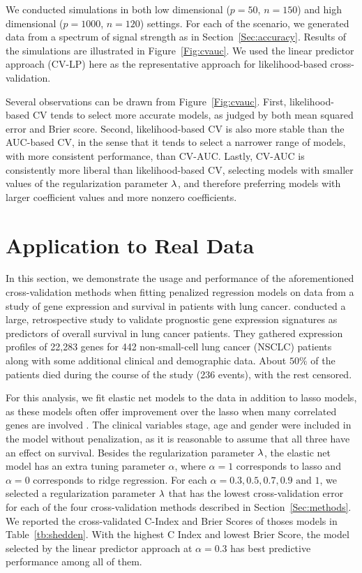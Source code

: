 \par We conducted simulations in both low dimensional ($p = 50$, $n = 150$) and high dimensional ($p = 1000$, $n = 120$) settings. For each of the scenario, we generated data from a spectrum of signal strength as in Section~\ref{Sec:accuracy}. Results of the simulations are illustrated in Figure~\ref{Fig:cvauc}.  We used the linear predictor approach (CV-LP) here as the representative approach for likelihood-based cross-validation.

Several observations can be drawn from Figure~\ref{Fig:cvauc}. First, likelihood-based CV tends to select more accurate models, as judged by both mean squared error and Brier score.  Second, likelihood-based CV is also more stable than the AUC-based CV, in the sense that it tends to select a narrower range of models, with more consistent performance, than CV-AUC.  Lastly, CV-AUC is consistently more liberal than likelihood-based CV, selecting models with smaller values of the regularization parameter $\lambda$, and therefore preferring models with larger coefficient values and more nonzero coefficients.

\section{Application to Real Data}

In this section, we demonstrate the usage and performance of the aforementioned cross-validation methods when fitting penalized regression models on data from a study of gene expression and survival in patients with lung cancer. \citet{shedden2008gene} conducted a large, retrospective study to validate prognostic gene expression signatures as predictors of overall survival in lung cancer patients. They gathered expression profiles of 22,283 genes for 442 non-small-cell lung cancer (NSCLC) patients along with some additional clinical and demographic data. About $50\%$ of the patients died during the course of the study (236 events), with the rest censored. 

For this analysis, we fit elastic net models to the data in addition to lasso models, as these models often offer improvement over the lasso when many correlated genes are involved \citep{Zou2005}. The clinical variables stage, age and gender were included in the model without penalization, as it is reasonable to assume that all three have an effect on survival. Besides the regularization parameter $\lambda$, the elastic net model has an extra tuning parameter $\alpha$, where $\alpha=1$ corresponds to lasso and $\alpha=0$ corresponds to ridge regression. For each $\alpha = 0.3, 0.5, 0.7, 0.9 \text{ and } 1$, we selected a regularization parameter $\lambda$ that has the lowest cross-validation error for each of the four cross-validation methods described in Section~\ref{Sec:methods}. We reported the cross-validated C-Index and Brier Scores of thoses models in Table~\ref{tb:shedden}. With the highest C Index and lowest Brier Score, the model selected by the linear predictor approach at $\alpha = 0.3$ has best predictive performance among all of them.

